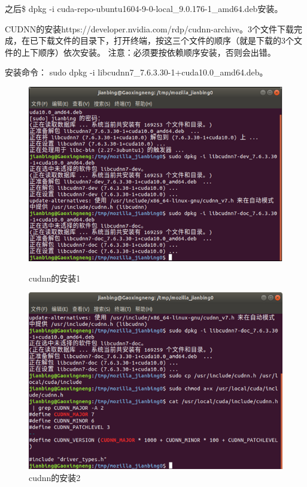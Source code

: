 \documentclass[openbib]{article}
\begin{document}
	之后\$ dpkg -i cuda-repo-ubuntu1604-9-0-local\_9.0.176-1\_amd64.deb安装。
	
	CUDNN的安装https://developer.nvidia.com/rdp/cudnn-archive。3个文件下载完成，在已下载文件的目录下，打开终端，按这三个文件的顺序（就是下载的3个文件的上下顺序）依次安装。
	注意：必须要按依赖顺序安装，否则会出错。
	
	安装命令：
	sudo dpkg -i libcudnn7\_7.6.3.30-1+cuda10.0\_amd64.deb。
	
	\begin{figure}[htbp]
		\centering
		\begin{minipage}[t]{0.48\textwidth}
			\centering
			\includegraphics[scale=0.4]{cudnn的安装1.png}
			\caption{cudnn的安装1}
		\end{minipage}
		\begin{minipage}[t]{0.48\textwidth}
			\centering
			\includegraphics[scale=0.4]{cudnn的安装2.png}
			\caption{cudnn的安装2}
		\end{minipage}
	\end{figure}
	
\end{document}

